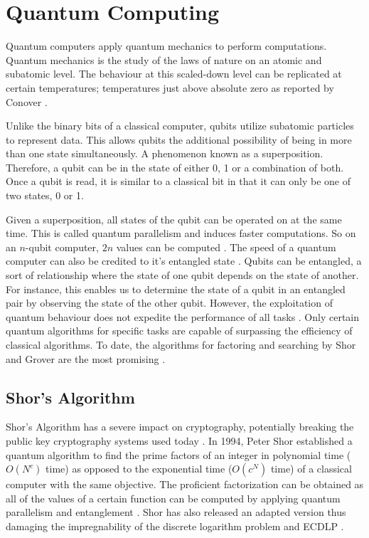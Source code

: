 \section{Quantum Computing}
Quantum computers apply quantum mechanics to perform computations. Quantum mechanics is the study of the laws of nature on an atomic and subatomic level. The behaviour at this scaled-down level can be replicated at certain temperatures; temperatures just above absolute zero as reported by Conover \cite{Q_Comp_Real}.

Unlike the binary bits of a classical computer, qubits utilize subatomic particles to represent data. 
This allows qubits the additional possibility of being in more than one state simultaneously.
A phenomenon known as a superposition. Therefore, a qubit can be in the state of either 0, 1 or a combination of both. Once a qubit is read, it is similar to a classical bit in that it can only be one of two states, 0 or 1.

Given a superposition, all states of the qubit can be operated on at the same time. This is called quantum parallelism and induces faster computations. So on an \(n\)-qubit computer, \(2n\) values can be computed \cite{Impact_QC_Cryptog}. The speed of a quantum computer can also be credited to it's entangled state \cite{Impact_QC_Cryptog_1}. 
Qubits can be entangled, a sort of relationship where the state of one qubit depends on the state of another. For instance, this enables us to determine the state of a qubit in an entangled pair by observing the state of the other qubit. 
However, the exploitation of quantum behaviour does not expedite the performance of all tasks \cite{Q_Comp_Real}. Only certain quantum algorithms for specific tasks are capable of surpassing the efficiency of classical algorithms. To date, the algorithms for factoring and searching by Shor and Grover are the most promising \cite{Impact_QC_Cryptog_1}.

\subsection{Shor's Algorithm}
Shor's Algorithm has a severe impact on cryptography, potentially breaking the public key cryptography systems used today \cite{Q_Alg}.
In 1994, Peter Shor established a quantum algorithm to find the prime factors of an integer in polynomial time (\(O(N^c)\) time) as opposed to the exponential time (\(O(c^N)\) time) of a classical computer with the same objective. 
The proficient factorization can be obtained as all of the values of a certain function can be computed by applying quantum parallelism and entanglement \cite{Impact_QC_Cryptog_1}. 
Shor has also released an adapted version thus damaging the impregnability of the discrete logarithm problem and ECDLP \cite{Post_Q_Cryptog}. 

